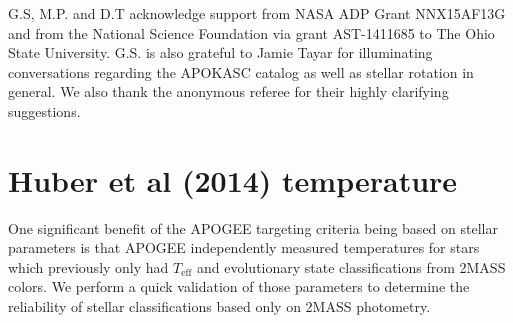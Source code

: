 \documentclass[preprint2]{aastex62}
\newcommand{\vsini}{\ensuremath{v \sin i}}
\newcommand{\Teff}{\ensuremath{T_{\textrm{eff}}}}
\newcommand{\afe}{\textrm{[\ensuremath{\alpha}/Fe]}}
\begin{document}
%
%
%
\acknowledgments

G.S, M.P. and D.T acknowledge support from NASA ADP Grant NNX15AF13G and from
the National Science Foundation via grant AST-1411685 to The Ohio State
University. G.S. is also grateful to Jamie Tayar for illuminating conversations
regarding the APOKASC catalog as well as stellar rotation in general. We also
thank the anonymous referee for their highly clarifying suggestions.






\appendix
\section{Huber et al (2014) temperature}
\label{sec:huber}

One significant benefit of the APOGEE targeting criteria being based on
\citet{Huber14} stellar parameters is that APOGEE independently measured
temperatures for stars which previously only had \Teff{} and evolutionary 
state classifications from 2MASS colors. We perform a quick validation of 
those parameters to determine the reliability of stellar classifications based 
only on 2MASS photometry.
\end{document}
